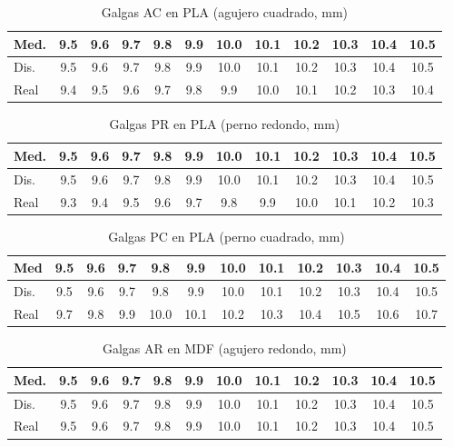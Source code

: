 \documentclass[11pt,a4paper]{article}
\begin{document}
\begin{table}[H]
\centering
\caption{Galgas AC en PLA (agujero cuadrado, \si{mm})}
\begin{tabular}{l*{11}{S[table-format=2.2]}}
\toprule
{Med.} & {9.5} & {9.6} & {9.7} & {9.8} & {9.9} & {10.0} & {10.1} & {10.2} & {10.3} & {10.4} & {10.5} \\
\midrule
Dis. & 9.5 & 9.6 & 9.7 & 9.8 & 9.9 & 10.0 & 10.1 & 10.2 & 10.3 & 10.4 & 10.5 \\
Real     & 9.4  & 9.5  & 9.6  & 9.7  & 9.8  & 9.9   & 10.0   & 10.1   & 10.2   & 10.3   & 10.4   \\
\bottomrule
\end{tabular}
\end{table}

\begin{table}[H]
\centering
\caption{Galgas PR en PLA (perno redondo, \si{mm})}
\begin{tabular}{l*{11}{S[table-format=2.2]}}
\toprule
{Med.} & {9.5} & {9.6} & {9.7} & {9.8} & {9.9} & {10.0} & {10.1} & {10.2} & {10.3} & {10.4} & {10.5} \\
\midrule
Dis. & 9.5 & 9.6 & 9.7 & 9.8 & 9.9 & 10.0 & 10.1 & 10.2 & 10.3 & 10.4 & 10.5 \\
Real     & 9.3  & 9.4  & 9.5  & 9.6  & 9.7  & 9.8   & 9.9   & 10.0   & 10.1   & 10.2   & 10.3   \\
\bottomrule
\end{tabular}
\end{table}

\begin{table}[H]
\centering
\caption{Galgas PC en PLA (perno cuadrado, \si{mm})}
\begin{tabular}{l*{11}{S[table-format=2.2]}}
\toprule
{Med} & {9.5} & {9.6} & {9.7} & {9.8} & {9.9} & {10.0} & {10.1} & {10.2} & {10.3} & {10.4} & {10.5} \\
\midrule
Dis. & 9.5 & 9.6 & 9.7 & 9.8 & 9.9 & 10.0 & 10.1 & 10.2 & 10.3 & 10.4 & 10.5 \\
Real     & 9.7  & 9.8  & 9.9  & 10.0  & 10.1  & 10.2   & 10.3   & 10.4   & 10.5   & 10.6   & 10.7   \\
\bottomrule
\end{tabular}
\end{table}

\begin{table}[H]
\centering
\caption{Galgas AR en MDF (agujero redondo, \si{mm})}
\begin{tabular}{l*{11}{S[table-format=2.2]}}
\toprule
{Med.} & {9.5} & {9.6} & {9.7} & {9.8} & {9.9} & {10.0} & {10.1} & {10.2} & {10.3} & {10.4} & {10.5} \\
\midrule
Dis. & 9.5 & 9.6 & 9.7 & 9.8 & 9.9 & 10.0 & 10.1 & 10.2 & 10.3 & 10.4 & 10.5 \\
Real     & 9.5 & 9.6 & 9.7 & 9.8 & 9.9 & 10.0 & 10.1 & 10.2 & 10.3 & 10.4 & 10.5 \\
\bottomrule
\end{tabular}
\end{table}
\end{document}
